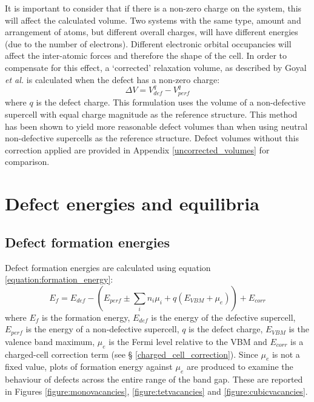 It is important to consider that if there is a non-zero charge on the system, this will affect the calculated volume. Two systems with the same type, amount and arrangement of atoms, but different overall charges, will have different energies (due to the number of electrons). Different electronic orbital occupancies will affect the inter-atomic forces and therefore the shape of the cell. In order to compensate for this effect, a `corrected' relaxation volume, as described by Goyal \emph{et al.} \cite{goyal2017conundrum} is calculated when the defect has a non-zero charge:
\begin{equation}
\Delta V = V_{def}^{q} - V_{perf}^{q}
\end{equation}
where $q$ is the defect charge. This formulation uses the volume of a non-defective supercell with equal charge magnitude as the reference structure. This method has been shown to yield more reasonable defect volumes than when using neutral non-defective supercells as the reference structure. Defect volumes without this correction applied are provided in Appendix \ref{uncorrected_volumes} for comparison.

\section{Defect energies and equilibria} 

\subsection{Defect formation energies}

Defect formation energies are calculated using equation \ref{equation:formation_energy}:
\begin{equation} \label{equation:formation_energy}
    E_{f} = E_{def} - (E_{perf} \pm \sum_{i} n_i\mu_i + q(E_{VBM} + \mu_{e})) + E_{corr}
\end{equation}
where $E_{f}$ is the formation energy, $E_{def}$ is the energy of the defective supercell, $E_{perf}$ is the energy of a non-defective supercell, $q$ is the defect charge, $E_{VBM}$ is the valence band maximum, $\mu_{e}$ is the Fermi level relative to the VBM and $E_{corr}$ is a charged-cell correction term (see § \ref{charged_cell_correction}). Since $\mu_{e}$ is not a fixed value, plots of formation energy against $\mu_{e}$ are produced to examine the behaviour of defects across the entire range of the band gap. These are reported in Figures \ref{figure:monovacancies}, \ref{figure:tetvacancies} and \ref{figure:cubicvacancies}.

